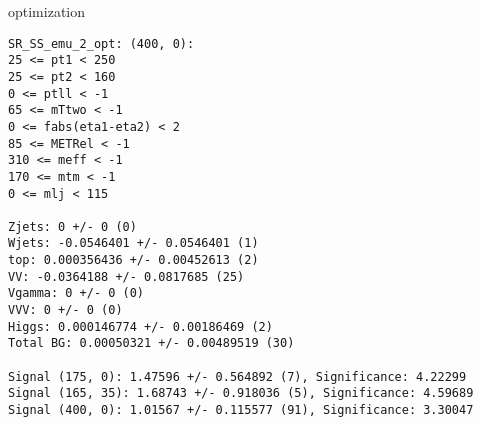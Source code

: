 \begin{frame}[fragile]{optimization}
\tiny
\begin{verbatim}
SR_SS_emu_2_opt: (400, 0):
25 <= pt1 < 250
25 <= pt2 < 160
0 <= ptll < -1
65 <= mTtwo < -1
0 <= fabs(eta1-eta2) < 2
85 <= METRel < -1
310 <= meff < -1
170 <= mtm < -1
0 <= mlj < 115

Zjets: 0 +/- 0 (0)
Wjets: -0.0546401 +/- 0.0546401 (1)
top: 0.000356436 +/- 0.00452613 (2)
VV: -0.0364188 +/- 0.0817685 (25)
Vgamma: 0 +/- 0 (0)
VVV: 0 +/- 0 (0)
Higgs: 0.000146774 +/- 0.00186469 (2)
Total BG: 0.00050321 +/- 0.00489519 (30)

Signal (175, 0): 1.47596 +/- 0.564892 (7), Significance: 4.22299
Signal (165, 35): 1.68743 +/- 0.918036 (5), Significance: 4.59689
Signal (400, 0): 1.01567 +/- 0.115577 (91), Significance: 3.30047
\end{verbatim}
\end{frame}
